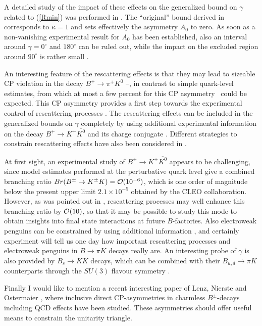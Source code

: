 A detailed study of the impact of these effects on the generalized
bound on $\gamma$ 
related to (\ref{Rmin}) was performed in \cite{defan}. The ``original''
bound derived in \cite{fm2} corresponds to $\kappa=1$ and sets effectively
the asymmetry $A_0$ to zero. As soon as a non-vanishing experimental 
result for 
$A_0$ has been established, also an interval around $\gamma=0^\circ$ and 
$180^\circ$ can be ruled out, while the impact on the excluded region around 
$90^\circ$ is rather small \cite{defan}. 

An interesting feature of the rescattering effects is that they may lead to 
sizeable CP violation in the decay $B^+\to\pi^+K^0$ 
\cite{gewe}--\cite{atso}, 
in contrast to simple 
quark-level estimates, from which at most a few percent for this CP 
asymmetry~\cite{pert-pens} could be expected. 
This CP asymmetry provides a first step towards 
the experimental control of rescattering processes \cite{defan}. The 
rescattering effects can be included in the generalized bounds on 
$\gamma$ completely 
by using additional experimental information on the decay $B^+\to K^+
\overline{K^0}$ and its charge conjugate \cite{defan,rf-FSI}. 
Different strategies to constrain rescattering effects have also been
considered in \cite{fknp}.

At first sight, an experimental study of $B^+\to K^+ \overline{K^0}$ appears 
to be challenging, since model estimates performed at the perturbative quark 
level give a combined branching ratio 
$Br(B^\pm\to K^\pm K)={\cal O}(10^{-6})$, which is one order of 
magnitude below the present upper limit $2.1\times10^{-5}$ obtained by the 
CLEO collaboration. However, as was pointed out in \cite{defan,rf-FSI}, 
rescattering processes may well enhance this branching ratio by 
${\cal O}(10)$, so that it may be possible to study this 
mode to obtain insights into final state interactions at future $B$-factories.
Also electroweak penguins can be constrained by using additional information
\cite{defan}, and certainly experiment will tell us one day how important
rescattering processes and electroweak penguins in $B\to\pi K$ decays really
are. An interesting probe of $\gamma$ is also provided by $B_s\to K
\overline{K}$ decays, which can be combined with their $B_{u,d}
\to\pi K$ counterparts through the $SU(3)$ flavour symmetry \cite{bskk}. 

Finally I would like to mention a recent interesting paper of Lenz,
Nierste and Ostermaier \cite{LNO}, 
where inclusive direct CP-asymmetries in 
charmless $B^{\pm}$-decays including QCD effects have been studied.
These asymmetries should offer useful means to constrain the unitarity
triangle.

